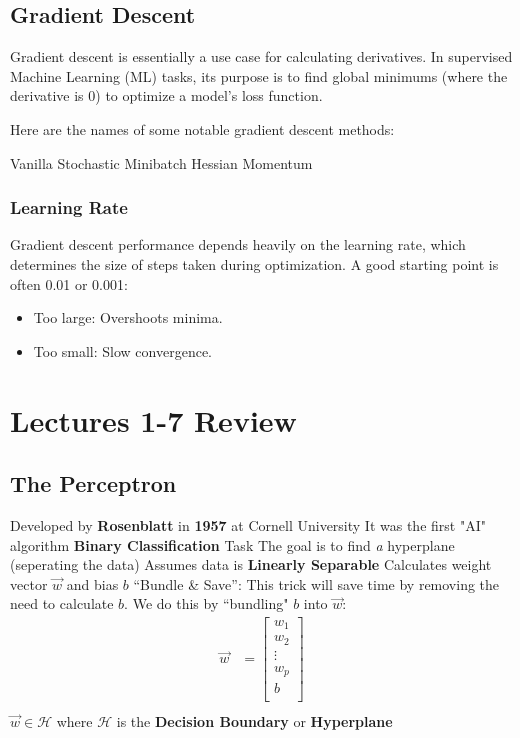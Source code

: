 \subsection{Gradient Descent}
Gradient descent \cite{goodfellow2016deep} is essentially a use case for calculating derivatives. In supervised Machine Learning (ML) tasks, its purpose is to find global minimums (where the derivative is 0) to optimize a model's loss function. 


Here are the names of some notable gradient descent methods:
\begin{outline}
    \1 Vanilla
    \1 Stochastic
    \1 Minibatch
    \1 Hessian
    \1 Momentum

\end{outline}
\subsubsection{Learning Rate}
Gradient descent performance depends heavily on the learning rate, which determines the size of steps taken during optimization. A good starting point is often 0.01 or 0.001:
\begin{itemize}
    \item Too large: Overshoots minima.
    \item Too small: Slow convergence.
\end{itemize}
\section{Lectures 1-7 Review}

\subsection{The Perceptron\cite{rosenblatt1958perceptron}}
\begin{outline}
    \1 Developed by \textbf{Rosenblatt} in \textbf{1957} at Cornell University
    \1 It was the first "AI" algorithm
    \1 \textbf{Binary Classification} Task
    \1 The goal is to find \textit{a} hyperplane (seperating the data)
    \1 Assumes data is \textbf{Linearly Separable}
    \1 Calculates weight vector $\vec{w}$ and bias $b$ 
    \1 ``Bundle \& Save'': This trick will save time by removing the need to calculate $b$. We do this by ``bundling" $b$ into $\vec{w}$: 
    \begin{align*}
    \vec{w} &= \begin{bmatrix}
           w_{1}    \\
           w_{2}    \\
           \vdots   \\
           w_{p}    \\
           b        \\
         \end{bmatrix} \\
    \end{align*}
    \1 $\vec{w} \in \mathcal{H}$ where $\mathcal{H}$ is the \textbf{Decision Boundary} or \textbf{Hyperplane}
    
\end{outline}

